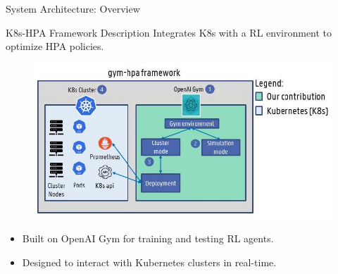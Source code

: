 \documentclass{beamer}
\begin{document}
\begin{frame}{System Architecture: Overview}
    \begin{block}{K8s-HPA Framework Description}
        Integrates K8s with a RL environment to optimize HPA policies.
    \end{block}
    \begin{figure}
        \includegraphics[width=\textwidth]{images/2024_11_17_21ad14b6196e5740bf69g-4.jpg} %
    \end{figure}
    \begin{itemize}
        \item Built on OpenAI Gym for training and testing RL agents.
        \item Designed to interact with Kubernetes clusters in real-time.
    \end{itemize}
\end{frame}
\end{document}
